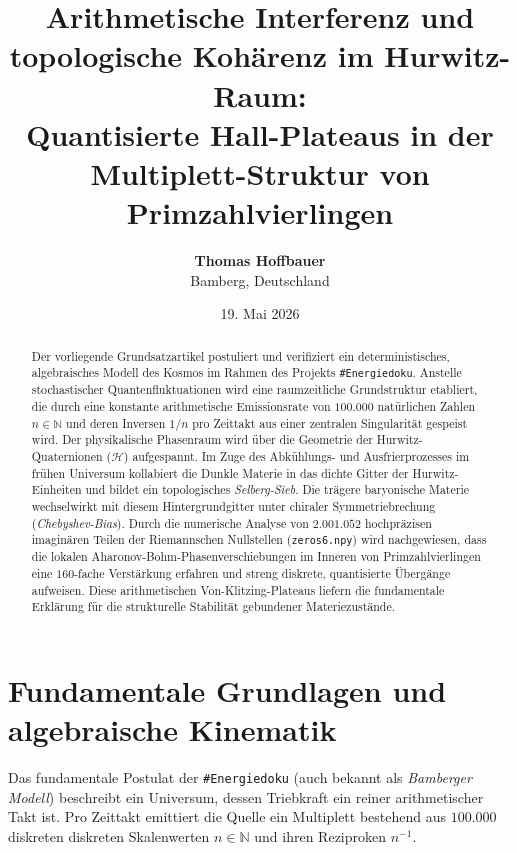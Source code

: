 \documentclass[11pt,a4paper]{article}
\title{\textbf{Arithmetische Interferenz und topologische Kohärenz im Hurwitz-Raum:\\
Quantisierte Hall-Plateaus in der Multiplett-Struktur von Primzahlvierlingen}}
\author{\textbf{Thomas Hoffbauer} \\ Bamberg, Deutschland}
\date{19. Mai 2026}
\begin{document}
\maketitle

\begin{abstract}
Der vorliegende Grundsatzartikel postuliert und verifiziert ein deterministisches, algebraisches Modell des Kosmos im Rahmen des Projekts \texttt{\#Energiedoku}. Anstelle stochastischer Quantenfluktuationen wird eine raumzeitliche Grundstruktur etabliert, die durch eine konstante arithmetische Emissionsrate von $100.000$ natürlichen Zahlen $n \in \mathbb{N}$ und deren Inversen $1/n$ pro Zeittakt aus einer zentralen Singularität gespeist wird. Der physikalische Phasenraum wird über die Geometrie der Hurwitz-Quaternionen ($\mathcal{H}$) aufgespannt. Im Zuge des Abkühlungs- und Ausfrierprozesses im frühen Universum kollabiert die Dunkle Materie in das dichte Gitter der Hurwitz-Einheiten und bildet ein topologisches \textit{Selberg-Sieb}. Die trägere baryonische Materie wechselwirkt mit diesem Hintergrundgitter unter chiraler Symmetriebrechung (\textit{Chebyshev-Bias}). Durch die numerische Analyse von $2.001.052$ hochpräzisen imaginären Teilen der Riemannschen Nullstellen (\texttt{zeros6.npy}) wird nachgewiesen, dass die lokalen Aharonov-Bohm-Phasenverschiebungen im Inneren von Primzahlvierlingen eine $160$-fache Verstärkung erfahren und streng diskrete, quantisierte Übergänge aufweisen. Diese arithmetischen Von-Klitzing-Plateaus liefern die fundamentale Erklärung für die strukturelle Stabilität gebundener Materiezustände.
\end{abstract}

\section{Fundamentale Grundlagen und algebraische Kinematik}
Das fundamentale Postulat der \texttt{\#Energiedoku} (auch bekannt als \textit{Bamberger Modell}) beschreibt ein Universum, dessen Triebkraft ein reiner arithmetischer Takt ist. Pro Zeittakt emittiert die Quelle ein Multiplett bestehend aus $100.000$ diskreten diskreten Skalenwerten $n \in \mathbb{N}$ und ihren Reziproken $n^{-1}$. 
\end{document}
